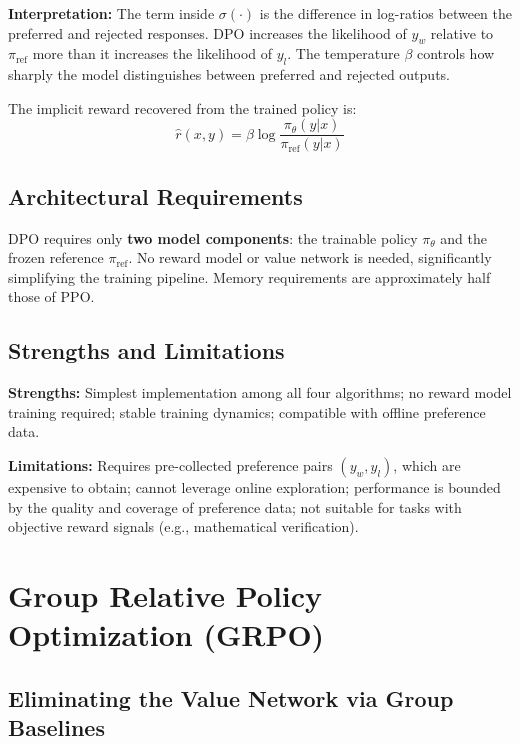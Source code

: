 \textbf{Interpretation:} The term inside $\sigma(\cdot)$ is the difference in log-ratios between the preferred and rejected responses. DPO increases the likelihood of $y_w$ relative to $\pi_{\text{ref}}$ more than it increases the likelihood of $y_l$. The temperature $\beta$ controls how sharply the model distinguishes between preferred and rejected outputs.

The implicit reward recovered from the trained policy is:
\begin{equation}
\hat{r}(x,y) = \beta\log\frac{\pi_\theta(y|x)}{\pi_{\text{ref}}(y|x)}
\end{equation}

\subsection{Architectural Requirements}

DPO requires only \textbf{two model components}: the trainable policy $\pi_\theta$ and the frozen reference $\pi_{\text{ref}}$. No reward model or value network is needed, significantly simplifying the training pipeline. Memory requirements are approximately half those of PPO.

\subsection{Strengths and Limitations}

\textbf{Strengths:} Simplest implementation among all four algorithms; no reward model training required; stable training dynamics; compatible with offline preference data.

\textbf{Limitations:} Requires pre-collected preference pairs $(y_w, y_l)$, which are expensive to obtain; cannot leverage online exploration; performance is bounded by the quality and coverage of preference data; not suitable for tasks with objective reward signals (e.g., mathematical verification).

\section{Group Relative Policy Optimization (GRPO)}
\label{sec:grpo}

\subsection{Eliminating the Value Network via Group Baselines}


